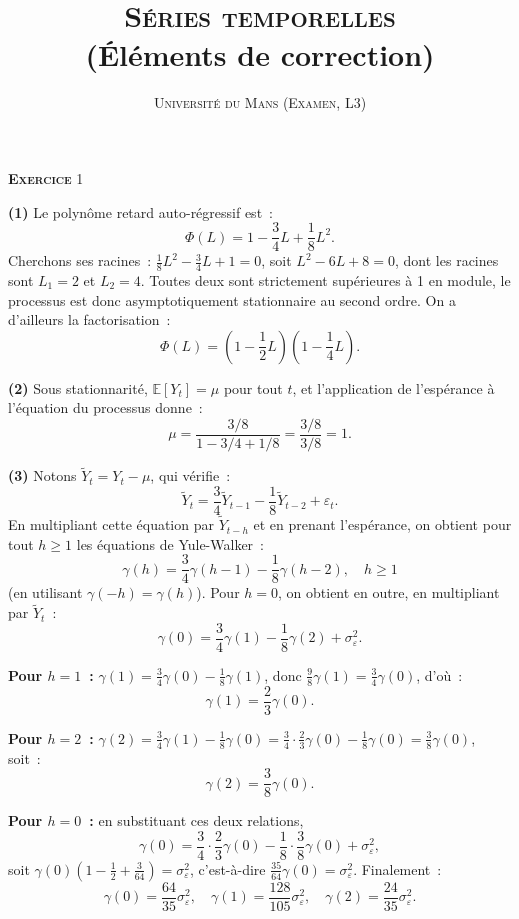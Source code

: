 \documentclass[11pt,a4paper,notitlepage]{article}
\newcommand{\exercice}[1]{\textsc{\textbf{Exercice}} #1}
\newcommand{\question}[1]{\textbf{(#1)}}
\begin{document}
\title{\textsc{Séries temporelles}\\(Éléments de correction)}
\author{\textsc{Université du Mans (Examen, L3)}}
\date{}


\maketitle

\exercice{1}\newline

\question{1} Le polynôme retard auto-régressif est~:
\[
\Phi(L) = 1 - \frac{3}{4}L + \frac{1}{8}L^2.
\]
Cherchons ses racines~: $\frac{1}{8}L^2 - \frac{3}{4}L + 1 = 0$, soit
$L^2 - 6L + 8 = 0$, dont les racines sont $L_1 = 2$ et $L_2 = 4$.
Toutes deux sont strictement supérieures à 1 en module, le processus
est donc asymptotiquement stationnaire au second ordre. On a
d'ailleurs la factorisation~:
\[
\Phi(L) = \left(1-\frac{1}{2}L\right)\left(1-\frac{1}{4}L\right).
\]
\newline

\question{2} Sous stationnarité, $\mathbb E[Y_t] = \mu$ pour tout $t$,
et l'application de l'espérance à l'équation du processus donne~:
\[
\mu = \frac{3/8}{1-3/4+1/8} = \frac{3/8}{3/8} = 1.
\]
\newline

\question{3} Notons $\tilde Y_t = Y_t - \mu$, qui vérifie~:
\[
\tilde Y_t = \frac{3}{4}\tilde Y_{t-1} - \frac{1}{8}\tilde Y_{t-2} + \varepsilon_t.
\]
En multipliant cette équation par $\tilde Y_{t-h}$ et en prenant
l'espérance, on obtient pour tout $h\geq 1$ les équations de
Yule-Walker~:
\[
\gamma(h) = \frac{3}{4}\gamma(h-1) - \frac{1}{8}\gamma(h-2),\quad h\geq 1
\]
(en utilisant $\gamma(-h)=\gamma(h)$). Pour $h=0$, on obtient en
outre, en multipliant par $\tilde Y_t$~:
\[
\gamma(0) = \frac{3}{4}\gamma(1) - \frac{1}{8}\gamma(2) + \sigma_{\varepsilon}^2.
\]

\textbf{Pour $h=1$~:} $\gamma(1) = \frac{3}{4}\gamma(0) -
\frac{1}{8}\gamma(1)$, donc $\frac{9}{8}\gamma(1) =
\frac{3}{4}\gamma(0)$, d'où~:
\[
\gamma(1) = \frac{2}{3}\gamma(0).
\]

\textbf{Pour $h=2$~:} $\gamma(2) = \frac{3}{4}\gamma(1) -
\frac{1}{8}\gamma(0) = \frac{3}{4}\cdot\frac{2}{3}\gamma(0) -
\frac{1}{8}\gamma(0) = \frac{3}{8}\gamma(0)$, soit~:
\[
\gamma(2) = \frac{3}{8}\gamma(0).
\]

\textbf{Pour $h=0$~:} en substituant ces deux relations,
\[
\gamma(0) = \frac{3}{4}\cdot\frac{2}{3}\gamma(0) - \frac{1}{8}\cdot\frac{3}{8}\gamma(0) + \sigma_{\varepsilon}^2,
\]
soit $\gamma(0)\left(1 - \frac{1}{2} + \frac{3}{64}\right) =
\sigma_{\varepsilon}^2$, c'est-à-dire $\frac{35}{64}\gamma(0) =
\sigma_{\varepsilon}^2$. Finalement~:
\[
\gamma(0) = \frac{64}{35}\sigma_{\varepsilon}^2,\quad
\gamma(1) = \frac{128}{105}\sigma_{\varepsilon}^2,\quad
\gamma(2) = \frac{24}{35}\sigma_{\varepsilon}^2.
\]
\newline
\end{document}
